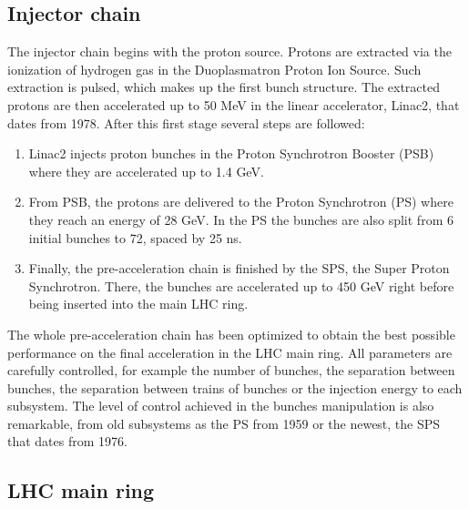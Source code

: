 \subsection{Injector chain}
\label{sec:injector}

The injector chain begins with the proton source. Protons are extracted via the ionization of hydrogen gas in the Duoplasmatron Proton Ion Source. Such extraction is pulsed, which makes up the first bunch structure. The extracted protons are then accelerated up to 50 MeV in the linear accelerator, Linac2, that dates from 1978. After this first stage several steps are followed:
\begin{enumerate}
\item Linac2 injects proton bunches in the Proton Synchrotron Booster (PSB) where they are accelerated up to 1.4 GeV. 
\item From PSB, the protons are delivered to the Proton Synchrotron (PS) where they reach an energy of 28 GeV. In the PS the bunches are also split from 6 initial bunches to 72, spaced by 25 ns.
\item Finally, the pre-acceleration chain is finished by the SPS, the Super Proton Synchrotron. There, the bunches are accelerated up to 450 GeV right before being inserted into the main LHC ring. 
\end{enumerate}

The whole pre-acceleration chain has been optimized to obtain the best possible performance on the final acceleration in the LHC main ring. All parameters are carefully controlled, for example the number of bunches, the separation between bunches, the separation between trains of bunches or the injection energy to each subsystem. The level of control achieved in the bunches manipulation is also remarkable, from old subsystems as the PS from 1959 or the newest, the SPS that dates from 1976. 


\subsection{LHC main ring}
\label{sec:ring}


